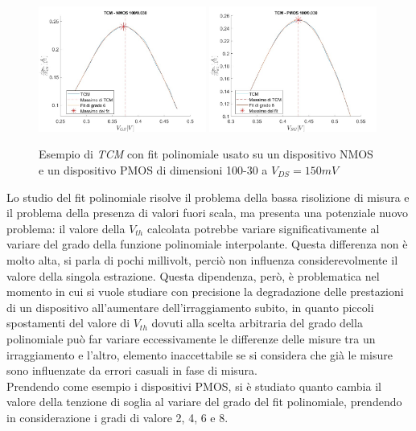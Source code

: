 \documentclass[12pt, letterpaper]{book}
\begin{document}
\begin{figure}[H]
  \centering
  \includegraphics[width=0.49\textwidth]{TCM-N4-100-30}
  \includegraphics[width=0.49\textwidth]{TCM-P1-100-30}
  \caption{Esempio di \emph{TCM} con fit polinomiale usato su un dispositivo NMOS e un dispositivo PMOS di dimensioni 100-30 a $V_{DS} = 150 mV$}
\end{figure}

Lo studio del fit polinomiale risolve il problema della bassa risolizione di misura e il problema della presenza di valori fuori scala, ma presenta una potenziale nuovo problema: il valore della $V_{th}$ calcolata potrebbe variare significativamente al variare del grado della funzione polinomiale interpolante. Questa differenza non è molto alta, si parla di pochi millivolt, perciò non influenza considerevolmente il valore della singola estrazione. Questa dipendenza, però, è problematica nel momento in cui si vuole studiare con precisione la degradazione delle prestazioni di un dispositivo all'aumentare dell'irraggiamento subito, in quanto piccoli spostamenti del valore di $V_{th}$ dovuti alla scelta arbitraria del grado della polinomiale può far variare eccessivamente le differenze delle misure tra un irraggiamento e l'altro, elemento inaccettabile se si considera che già le misure sono influenzate da errori casuali in fase di misura.\\
Prendendo come esempio i dispositivi PMOS, si è studiato quanto cambia il valore della tenzione di soglia al variare del grado del fit polinomiale, prendendo in considerazione i gradi di valore 2, 4, 6 e 8.\\
\end{document}
